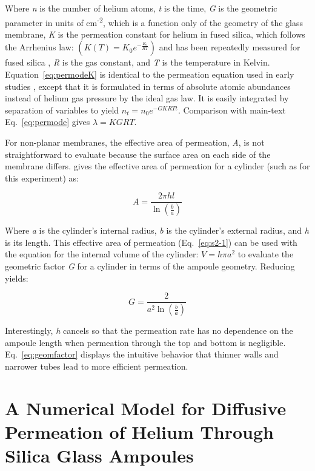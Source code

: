 Where \emph{n} is the number of helium atoms, \emph{t} is the time, \emph{G} is the geometric parameter in units of cm\textsuperscript{-2}, which is a function only of the geometry of the glass membrane, \emph{K} is the permeation constant for helium in fused silica, which follows the Arrhenius law: \(\left( K(T) = K_{0}e^{- \frac{E_{a}}{RT}} \right)\) and has been repeatedly measured for fused silica \citep{norton1953,altemose1961,swets1961,masaryk1968}, \emph{R} is the gas constant, and \emph{T} is the temperature in Kelvin. Equation~\eqref{eq:permodeK} is identical to the permeation equation used in early studies \citep{norton1953,altemose1961,swets1961,studt1962,masaryk1968}, except that it is formulated in terms of absolute atomic abundances instead of helium gas pressure by the ideal gas law. It is easily integrated by separation of variables to yield \(n_{t} = n_{0}e^{- GKRTt}\). Comparison with main-text Eq.~\eqref{eq:permode} gives \(\lambda = KGRT\).

For non-planar membranes, the effective area of permeation, \emph{A}, is
not straightforward to evaluate because the surface area on each side of
the membrane differs. \citet{masaryk1968} gives the effective area of
permeation for a cylinder (such as for this experiment) as:

\begin{equation}
A = \frac{2\pi hl}{\ln\left( \frac{b}{a} \right)}
\label{eq:s2-1}
\end{equation}

Where \emph{a} is the cylinder's internal radius, \emph{b} is the
cylinder's external radius, and \emph{h} is its length. This effective area of
permeation (Eq.~\eqref{eq:s2-1}) can be used with the equation for the internal
volume of the cylinder: \(V = h\pi a^{2}\) to evaluate the geometric
factor \emph{G} for a cylinder in terms of the ampoule
geometry. Reducing yields:

\begin{equation}
\label{eq:geomfactor}
G = \frac{2}{a^{2}\ln\left( \frac{b}{a} \right)}
\end{equation}

Interestingly, \emph{h} cancels so that the permeation rate has no
dependence on the ampoule length when permeation through the top and
bottom is negligible. Eq.~\eqref{eq:geomfactor} displays the intuitive behavior that
thinner walls and narrower tubes lead to more efficient permeation.

\section{A Numerical Model for Diffusive Permeation of Helium Through
Silica Glass
Ampoules}\label{a-numerical-model-for-diffusive-permeation-of-helium-through-silica-glass-ampoules}

